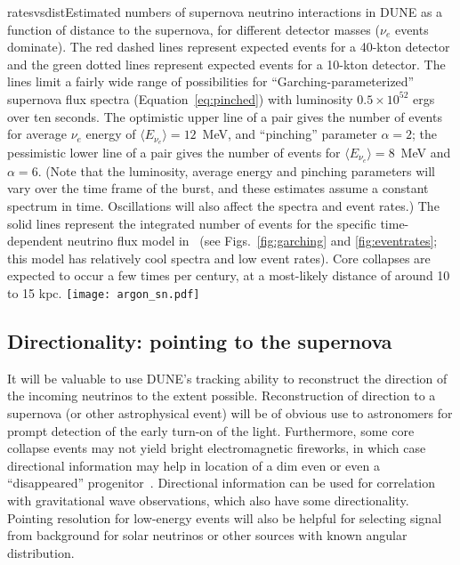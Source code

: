 \begin{dunefigure}{ratesvsdist}{Estimated numbers of supernova neutrino interactions in DUNE as a function of distance to the supernova, for different detector masses ($\nu_e$ events dominate). The red dashed lines represent expected events for a 40-kton detector and the green dotted lines represent expected events for a 10-kton detector. The lines limit a fairly wide range of possibilities for ``Garching-parameterized'' supernova flux spectra (Equation~\ref{eq:pinched}) with luminosity $0.5\times 10^{52}$ ergs over ten seconds. The optimistic upper line of a pair gives the number of events for average $\nu_e$ energy of $\langle E_{\nu_e}\rangle =12$~MeV, and ``pinching'' parameter $\alpha=2$; the pessimistic lower line of a pair gives the number of events for $\langle E_{\nu_e}\rangle=8$~MeV and $\alpha=6$. (Note that the luminosity, average energy and pinching parameters will vary over the time frame of the burst, and these estimates assume a constant spectrum in time. Oscillations will also affect the spectra and event rates.) The solid lines represent the integrated number of events for the specific time-dependent neutrino flux model in~\cite{Huedepohl:2009wh} (see Figs.~\ref{fig:garching} and \ref{fig:eventrates}; this model has relatively cool spectra and low event rates). Core collapses are expected to occur a few times per century, at a most-likely distance of around 10 to 15 kpc.}
\texttt{[image: argon\_sn.pdf]}
\end{dunefigure}


\subsection{Directionality: pointing to the supernova}



It will be valuable to use DUNE's tracking ability to reconstruct the direction of the incoming neutrinos to the extent possible.  Reconstruction of direction to a supernova (or other astrophysical event) will be of obvious use to astronomers for prompt detection of the early turn-on of the light.  Furthermore, some core collapse events may not yield bright electromagnetic fireworks, in which case directional information may help in location of a dim even or even a ``disappeared'' progenitor~\cite{Kochanek}.
Directional information can be used for correlation with gravitational wave observations, which also have some directionality.  Pointing resolution for low-energy events will also be helpful for selecting signal from background for solar neutrinos or other sources with known angular distribution.

